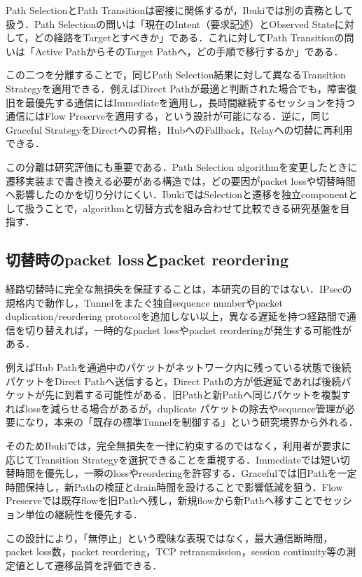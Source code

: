 \documentclass[11pt,a4paper,twoside]{ltjsarticle}
\begin{document}
Path SelectionとPath Transitionは密接に関係するが，Ibukiでは別の責務として扱う．Path Selectionの問いは「現在のIntent（要求記述）とObserved Stateに対して，どの経路をTargetとすべきか」である．これに対してPath Transitionの問いは「Active PathからそのTarget Pathへ，どの手順で移行するか」である．

この二つを分離することで，同じPath Selection結果に対して異なるTransition Strategyを適用できる．例えばDirect Pathが最適と判断された場合でも，障害復旧を最優先する通信にはImmediateを適用し，長時間継続するセッションを持つ通信にはFlow Preserveを適用する，という設計が可能になる．逆に，同じGraceful StrategyをDirectへの昇格，HubへのFallback，Relayへの切替に再利用できる．

この分離は研究評価にも重要である．Path Selection algorithmを変更したときに遷移実装まで書き換える必要がある構造では，どの要因がpacket lossや切替時間へ影響したのかを切り分けにくい．IbukiではSelectionと遷移を独立componentとして扱うことで，algorithmと切替方式を組み合わせて比較できる研究基盤を目指す．

\subsection{切替時のpacket lossとpacket reordering}

経路切替時に完全な無損失を保証することは，本研究の目的ではない．IPsecの規格内で動作し，Tunnelをまたぐ独自sequence numberやpacket duplication/reordering protocolを追加しない以上，異なる遅延を持つ経路間で通信を切り替えれば，一時的なpacket lossやpacket reorderingが発生する可能性がある．

例えばHub Pathを通過中のパケットがネットワーク内に残っている状態で後続パケットをDirect Pathへ送信すると，Direct Pathの方が低遅延であれば後続パケットが先に到着する可能性がある．旧Pathと新Pathへ同じパケットを複製すればlossを減らせる場合があるが，duplicate パケットの除去やsequence管理が必要になり，本来の「既存の標準Tunnelを制御する」という研究境界から外れる．

そのためIbukiでは，完全無損失を一律に約束するのではなく，利用者が要求に応じてTransition Strategyを選択できることを重視する．Immediateでは短い切替時間を優先し，一瞬のlossやreorderingを許容する．Gracefulでは旧Pathを一定時間保持し，新Pathの検証とdrain時間を設けることで影響低減を狙う．Flow Preserveでは既存flowを旧Pathへ残し，新規flowから新Pathへ移すことでセッション単位の継続性を優先する．

この設計により，「無停止」という曖昧な表現ではなく，最大通信断時間，packet loss数，packet reordering，TCP retransmission，session continuity等の測定値として遷移品質を評価できる．
\end{document}
